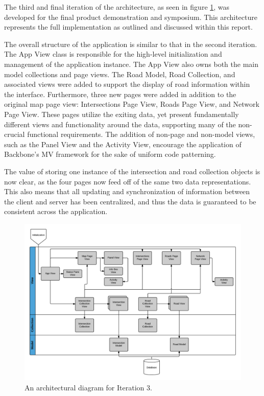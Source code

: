\documentclass{report}
\begin{document}
The third and final iteration of the architecture, as seen in figure \ref{fig:iteration3}, was developed for the final product demonstration and symposium. This architecture represents the full implementation as outlined and discussed within this report.

The overall structure of the application is similar to that in the second iteration. The App View class is responsible for the high-level initialization and management of the application instance. The App View also owns both the main model collections and page views. The Road Model, Road Collection, and associated views were added to support the display of road information within the interface. Furthermore, three new pages were added in addition to the original map page view: Intersections Page View, Roads Page View, and Network Page View. These pages utilize the exiting data, yet present fundamentally different views and functionality around the data, supporting many of the non-crucial functional requirements. The addition of non-page and non-model views, such as the Panel View and the Activity View, encourage the application of Backbone's MV framework for the sake of uniform code patterning.

The value of storing one instance of the intersection and road collection objects is now clear, as the four pages now feed off of the same two data representations. This also means that all updating and synchronization of information between the client and server has been centralized, and thus the data is guaranteed to be consistent across the application.



\begin{figure}[htbp!]
  \begin{centering}
    \includegraphics[scale=0.25]{figures/Iteration-3.png}
    \caption{An architectural diagram for Iteration 3.}
    \label{fig:iteration3}
  \end{centering}
\end{figure}
\end{document}
